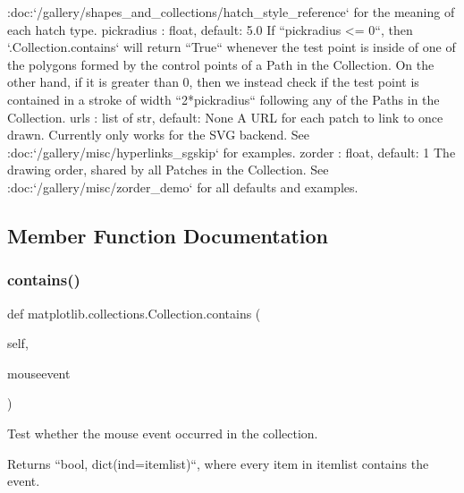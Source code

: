 \begin{DoxyVerb}
    :doc:`/gallery/shapes_and_collections/hatch_style_reference` for
    the meaning of each hatch type.
pickradius : float, default: 5.0
    If ``pickradius <= 0``, then `.Collection.contains` will return
    ``True`` whenever the test point is inside of one of the polygons
    formed by the control points of a Path in the Collection. On the
    other hand, if it is greater than 0, then we instead check if the
    test point is contained in a stroke of width ``2*pickradius``
    following any of the Paths in the Collection.
urls : list of str, default: None
    A URL for each patch to link to once drawn. Currently only works
    for the SVG backend. See :doc:`/gallery/misc/hyperlinks_sgskip` for
    examples.
zorder : float, default: 1
    The drawing order, shared by all Patches in the Collection. See
    :doc:`/gallery/misc/zorder_demo` for all defaults and examples.
\end{DoxyVerb}
 

\subsection{Member Function Documentation}
\mbox{\label{classmatplotlib_1_1collections_1_1Collection_a1b48cbe72f400a5e4e9749eeb04c6959}} 
\subsubsection{\texorpdfstring{contains()}{contains()}}
{\footnotesize\ttfamily def matplotlib.\+collections.\+Collection.\+contains (\begin{DoxyParamCaption}\item[{}]{self,  }\item[{}]{mouseevent }\end{DoxyParamCaption})}

\begin{DoxyVerb}Test whether the mouse event occurred in the collection.

Returns ``bool, dict(ind=itemlist)``, where every item in itemlist
contains the event.
\end{DoxyVerb}
 \mbox{\label{classmatplotlib_1_1collections_1_1Collection_a654b54a71ca0414635e6fc6c0d8d03fe}} 
